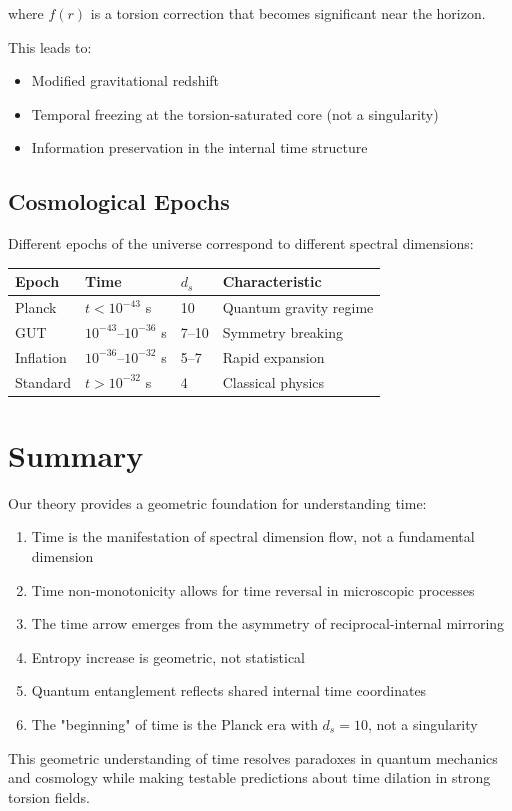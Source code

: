 where $f(r)$ is a torsion correction that becomes significant near the horizon.

This leads to:
\begin{itemize}
    \item Modified gravitational redshift
    \item Temporal freezing at the torsion-saturated core (not a singularity)
    \item Information preservation in the internal time structure
\end{itemize}

\subsection{Cosmological Epochs}

Different epochs of the universe correspond to different spectral dimensions:

\begin{center}
\begin{tabular}{llll}
\toprule
Epoch & Time & $d_s$ & Characteristic \\ \midrule
Planck & $t < 10^{-43}$ s & 10 & Quantum gravity regime \\
GUT & $10^{-43}$--$10^{-36}$ s & 7--10 & Symmetry breaking \\
Inflation & $10^{-36}$--$10^{-32}$ s & 5--7 & Rapid expansion \\
Standard & $t > 10^{-32}$ s & 4 & Classical physics \\
\bottomrule
\end{tabular}
\end{center}

\section{Summary}

Our theory provides a geometric foundation for understanding time:
\begin{enumerate}
    \item Time is the manifestation of spectral dimension flow, not a fundamental dimension
    \item Time non-monotonicity allows for time reversal in microscopic processes
    \item The time arrow emerges from the asymmetry of reciprocal-internal mirroring
    \item Entropy increase is geometric, not statistical
    \item Quantum entanglement reflects shared internal time coordinates
    \item The "beginning" of time is the Planck era with $d_s = 10$, not a singularity
\end{enumerate}

This geometric understanding of time resolves paradoxes in quantum mechanics and cosmology while making testable predictions about time dilation in strong torsion fields.
